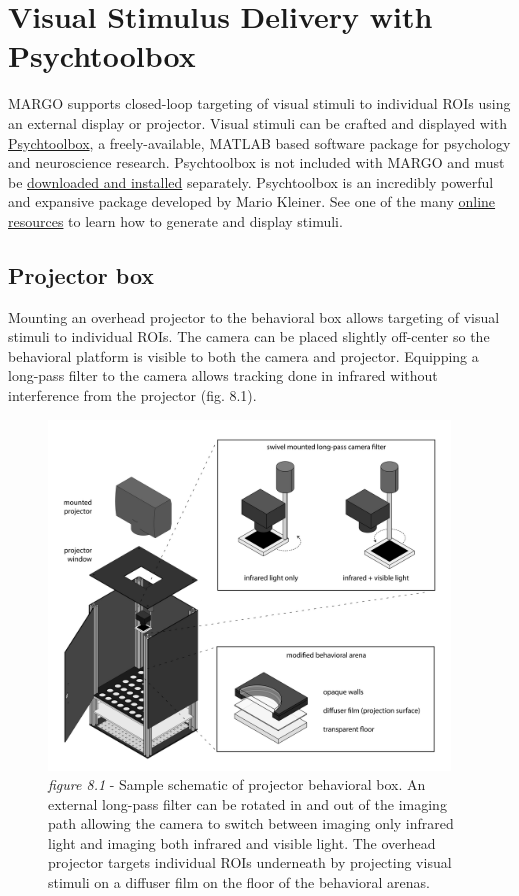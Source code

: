 \documentclass[11pt]{article}
\begin{document}
\newpage
\section{Visual Stimulus Delivery with Psychtoolbox}

MARGO supports closed-loop targeting of visual stimuli to individual ROIs using an external display or projector. Visual stimuli can be crafted and displayed with \href{http://psychtoolbox.org/overview/}{Psychtoolbox}, a freely-available, MATLAB based software package for psychology and neuroscience research. Psychtoolbox is not included with MARGO and must be \href{http://psychtoolbox.org/download/}{downloaded and installed} separately. Psychtoolbox is an incredibly powerful and expansive package developed by Mario Kleiner. See one of the many \href{http://peterscarfe.com/ptbtutorials.html}{online resources} to learn how to generate and display stimuli.

\subsection{Projector box}

Mounting an overhead projector to the behavioral box allows targeting of visual stimuli to individual ROIs. The camera can be placed slightly off-center so the behavioral platform is visible to both the camera and projector. Equipping a long-pass filter to the camera allows tracking done in infrared without interference from the projector (fig. 8.1). 

\begin{figure}[h!]
	\begin{center}
		\includegraphics[width=0.95\textwidth]{images/projector/proj_schematic.pdf}
		\caption*{\footnotesize {\textit{figure 8.1} - Sample schematic of projector behavioral box. An external long-pass filter can be rotated in and out of the imaging path allowing the camera to switch between imaging only infrared light and imaging both infrared and visible light. The overhead projector targets individual ROIs underneath by projecting visual stimuli on a diffuser film on the floor of the behavioral arenas.}}
	\end{center}
\end{figure}
\end{document}
